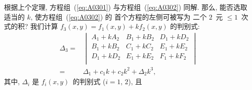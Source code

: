 \documentclass[%
    UTF8,%
    fontset=none,%
    punct=kaiming,%
    zihao=-4,%
    a4paper,%
    oneside,%
]{ctexbook}
\renewcommand*{\leq}{\leqslant}
\begin{document}
根据上个定理,
方程组~(\ref{eq:A0301}) 与方程组~(\ref{eq:A0302})
同解.
那么, 能否选取适当的 \(k\),
使方程组~(\ref{eq:A0302}) 的%
首个方程的左侧可被写为%
二个 \(2\)~元 \({\leq} 1\)~次式的积?
我们计算 \(f_3 (x, y) = f_1 (x, y) + kf_2 (x, y)\)
的判别式:
\begin{align*}
    \Delta_3
    = {} & \begin{vmatrix}
               A_1 + kA_2 & B_1 + kB_2 & D_1 + kD_2 \\
               B_1 + kB_2 & C_1 + kC_2 & E_1 + kE_2 \\
               D_1 + kD_2 & E_1 + kE_2 & F_1 + kF_2 \\
           \end{vmatrix}       \\
    = {} & \Delta_1 + c_1 k + c_2 k^2 + \Delta_2 k^3,
\end{align*}
其中, \(\Delta_i\) 是 \(f_i (x, y)\)~的判别式
(\(i = 1\), \(2\)), 且
\end{document}
